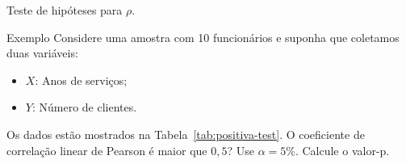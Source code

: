 \documentclass[9pt]{beamer}
\begin{document}
\begin{frame}{Teste de hipóteses para $\rho$.}

\begin{block}{Exemplo}
	Considere uma amostra com 10 funcionários e suponha que coletamos duas variáveis:
	\begin{itemize}
		\item $X$: Anos de serviços;
		\item $Y$: Número de clientes.
	\end{itemize}
	Os dados estão mostrados na Tabela~\ref{tab:positiva-test}. O coeficiente de correlação linear de Pearson é maior que $0,5$? Use $\alpha=5\%$. Calcule o valor-p.
	\begin{table}[ht]
		\centering
		\caption{Amostra de 10 corretores de seguros.} 
		\label{tab:positiva-test}
	\end{table}
\end{block}

\end{frame}
\end{document}
